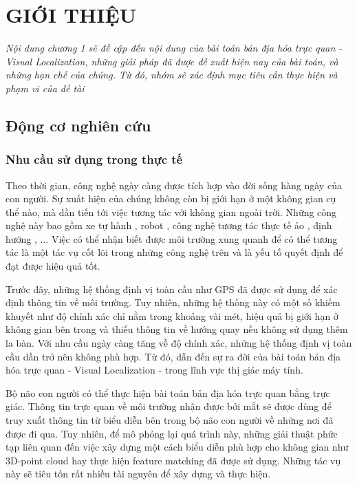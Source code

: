 \chapter{GIỚI THIỆU}

\textit{Nội dung chương 1 sẽ đề cập đến nội dung của bài toán bản địa hóa trực quan - Visual Localization, những giải pháp đã được đề xuất hiện nay của bài toán, và những hạn chế của chúng. Từ đó, nhóm sẽ xác định mục tiêu cần thực hiện và phạm vi của đề tài}

\section{Động cơ nghiên cứu}

\subsection*{Nhu cầu sử dụng trong thực tế}

Theo thời gian, công nghệ ngày càng được tích hợp vào đời sống hàng ngày của con người. Sự xuất hiện của chúng không còn bị giới hạn ở một không gian cụ thể nào, mà dần tiến tới việc tương tác với không gian ngoài trời. Những công nghệ này bao gồm xe tự hành \cite{chaabane2021end}, robot \cite{sunderhauf2015place}, công nghệ tương tác thực tế ảo \cite{middelberg2014scalable}, định hướng \cite{sarlin2023orienternet}, ... Việc có thể nhận biết được môi trường xung quanh để có thể tương tác là một tác vụ cốt lõi trong những công nghệ trên và là yếu tố quyết định để đạt được hiệu quả tốt. 

Trước đây, những hệ thống định vị toàn cầu như GPS đã được sử dụng để xác định thông tin về môi trường. Tuy nhiên, những hệ thống này có một số khiếm khuyết như độ chính xác chỉ nằm trong khoảng vài mét, hiệu quả bị giới hạn ở không gian bên trong và thiếu thông tin về hướng quay nếu không sử dụng thêm la bàn. Với nhu cầu ngày càng tăng về độ chính xác, những hệ thống định vị toàn cầu dần trở nên không phù hợp. Từ đó, dẫn đến sự ra đời của bài toán bản địa hóa trực quan - Visual Localization - trong lĩnh vực thị giác máy tính.

Bộ não con người có thể thực hiện bài toán bản địa hóa trực quan bằng trực giác. Thông tin trực quan về môi trường nhận được bởi mắt sẽ được dùng để truy xuất thông tin từ biểu diễn bên trong bộ não con người về những nơi đã được đi qua. Tuy nhiên, để mô phỏng lại quá trình này, những giải thuật phức tạp liên quan đến việc xây dựng một cách biểu diễn phù hợp cho không gian như 3D-point cloud hay thực hiện feature matching đã được sử dụng. Những tác vụ này sẽ tiêu tốn rất nhiều tài nguyên để xây dựng và thực hiện.

